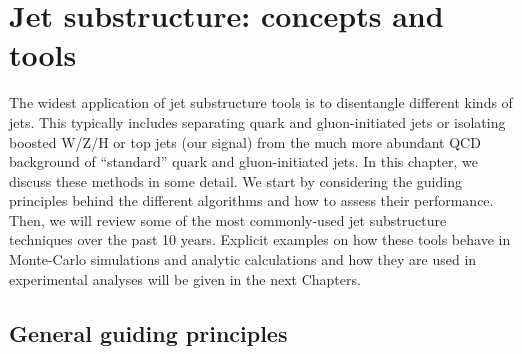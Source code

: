 %
\chapter{Jet substructure: concepts and tools}\label{tools}

The widest application of jet substructure tools is to disentangle
different kinds of jets. This typically includes separating quark and
gluon-initiated jets or isolating boosted W/Z/H or top jets (our
signal) from the much more abundant QCD background of ``standard''
quark and gluon-initiated jets.
%
In this chapter, we discuss these methods in some detail. We start by considering 
the guiding principles behind the different algorithms and how to assess their performance. 
%
Then, we will review some of
the most commonly-used jet substructure techniques over the past 10
years. 
%
Explicit examples on how these tools behave in Monte-Carlo
simulations and analytic calculations and how they are used in
experimental analyses will be given in the next Chapters.


\section{General guiding principles}\label{sec:tools-generic}

